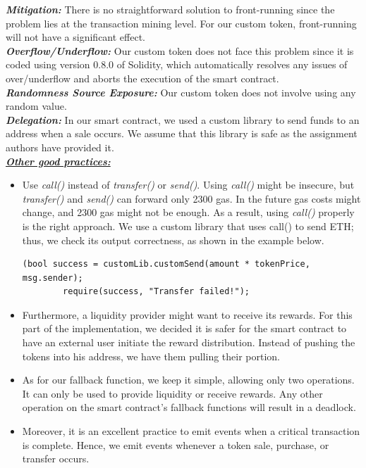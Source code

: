 \documentclass[12pt,a4paper]{article}
\begin{document}
\textbf{\emph{Mitigation: }}There is no straightforward solution to
front-running since the problem lies at the transaction mining level. For our
custom token, front-running will not have a significant effect. \\

\textbf{\emph{Overflow/Underflow: }} Our custom token does not face this problem
since it is coded using version 0.8.0 of Solidity, which automatically resolves
any issues of over/underflow and aborts the execution of the smart contract.\\

\textbf{\emph{Randomness Source Exposure: }} Our custom token does not involve
using any random value. \\

\textbf{\emph{Delegation: }}In our smart contract, we used a custom library to
send funds to an address when a sale occurs. We assume that this library is safe
as the assignment authors have provided it. \\

\textbf{\emph{\underline{Other good practices:}}}

\begin{itemize}
    \item Use \emph{call()} instead of \emph{transfer()} or \emph{send()}. Using
    \emph{call()}  might be insecure, but \emph{transfer()} and \emph{send()}
    can forward only 2300 gas. In the future gas costs might change, and 2300
    gas might not be enough. As a result, using \emph{call()} properly is the
    right approach. We use a custom library that uses call() to send ETH; thus,
    we check its output correctness, as shown in the example below.\\
    \begin{lstlisting}[language=Solidity]
        (bool success = customLib.customSend(amount * tokenPrice, msg.sender);
        require(success, "Transfer failed!");
    \end{lstlisting}
    \item Furthermore, a liquidity provider might want to receive its rewards.
    For this part of the implementation, we decided it is safer for the smart
    contract to have an external user initiate the reward distribution. Instead
    of pushing the tokens into his address, we have them pulling their portion.
    \item As for our fallback function, we keep it simple, allowing only two
    operations. It can only be used to provide liquidity or receive rewards. Any
    other operation on the smart contract's fallback functions will result in a
    deadlock.
    \item Moreover, it is an excellent practice to emit events when a critical
    transaction is complete. Hence, we emit events whenever a token sale,
    purchase, or transfer occurs.
\end{itemize}
\end{document}
